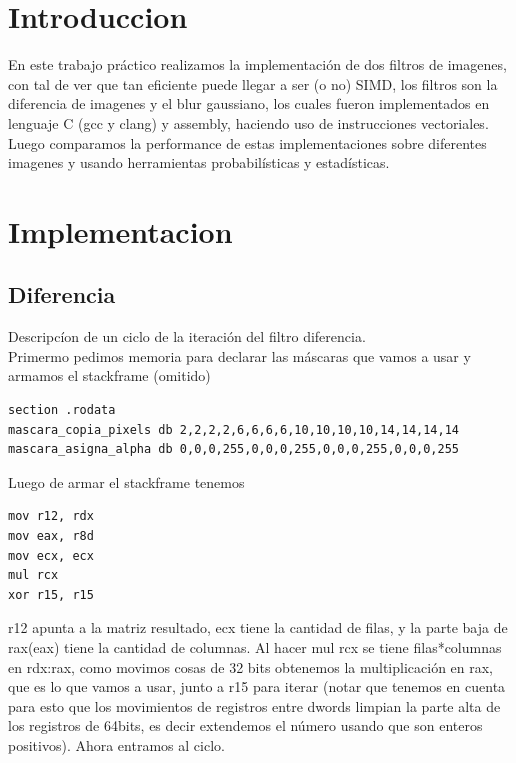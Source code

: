 \documentclass[a4paper]{article}
\begin{document}
\thispagestyle{empty}


\maketitle 

\tableofcontents

\newpage

\section{Introduccion}
En este trabajo práctico realizamos la implementación de dos filtros de imagenes, con tal de ver que tan eficiente puede llegar a ser (o no) SIMD, los filtros son la diferencia de imagenes y el blur gaussiano, los cuales fueron implementados en lenguaje C (gcc y clang) y assembly, haciendo uso de instrucciones vectoriales. Luego comparamos la performance de estas implementaciones sobre diferentes imagenes y usando herramientas probabilísticas y estadísticas.

\section{Implementacion}

\subsection{Diferencia}
 Descripcíon de un ciclo de la iteración del filtro diferencia.\\
Primermo pedimos memoria para declarar las máscaras que vamos a usar y armamos el stackframe (omitido)
\begin{codesnippet}
\begin{verbatim}
section .rodata
mascara_copia_pixels db 2,2,2,2,6,6,6,6,10,10,10,10,14,14,14,14
mascara_asigna_alpha db 0,0,0,255,0,0,0,255,0,0,0,255,0,0,0,255
\end{verbatim}
\end{codesnippet}

 Luego de armar el stackframe tenemos
\begin{codesnippet}
\begin{verbatim}
mov r12, rdx
mov eax, r8d
mov ecx, ecx
mul rcx
xor r15, r15
\end{verbatim}
\end{codesnippet}
r12 apunta a la matriz resultado, ecx tiene la cantidad de filas, y la parte baja de rax(eax) tiene la cantidad de columnas. Al hacer mul rcx se tiene filas*columnas en rdx:rax, como movimos cosas de 32 bits obtenemos la multiplicación en rax, que es lo que vamos a usar, junto a r15 para iterar (notar que tenemos en cuenta para esto que los movimientos de registros entre dwords limpian la parte alta de los registros de 64bits, es decir extendemos el número usando que son enteros positivos). Ahora entramos al ciclo.
\end{document}
